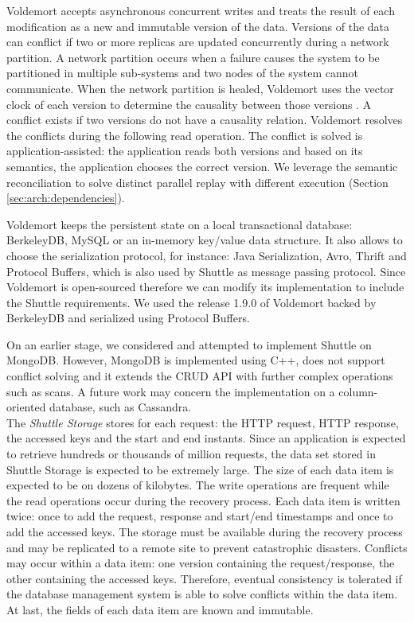 Voldemort accepts asynchronous concurrent writes and treats the result of each modification as a new and immutable version of the data. Versions of the data can conflict if two or more replicas are updated concurrently during a network partition. A network partition occurs when a failure causes the system to be partitioned in multiple sub-systems and two nodes of the system cannot communicate. When the network partition is healed, Voldemort uses the vector clock of each version to determine the causality between those versions \cite{Decandia2007}. A conflict exists if two versions do not have a causality relation. Voldemort resolves the conflicts during the following read operation. The conflict is solved is application-assisted: the application reads both versions and based on its semantics, the application chooses the correct version. We leverage the semantic reconciliation to solve distinct parallel replay with different execution (Section \ref{sec:arch:dependencies}).

Voldemort keeps the persistent state on a local transactional database: BerkeleyDB, MySQL or an in-memory key/value data structure. It also allows to choose the serialization protocol, for instance: Java Serialization, Avro, Thrift and Protocol Buffers, which is also used by Shuttle as message passing protocol. Since Voldemort is open-sourced therefore we can modify its implementation to include the Shuttle requirements. We used the release 1.9.0 of Voldemort backed by BerkeleyDB and serialized using Protocol Buffers.

On an earlier stage, we considered and attempted to implement Shuttle on MongoDB. However, MongoDB is implemented using C++, does not support conflict solving and it extends the \ac{CRUD} \ac{API} with further complex operations such as scans. A future work may concern the implementation on a column-oriented database, such as Cassandra.\\

The \emph{Shuttle Storage} stores for each request: the \ac{HTTP} request, \ac{HTTP} response, the accessed keys and the start and end instants. Since an application is expected to retrieve hundreds or thousands of million requests, the data set stored in Shuttle Storage is expected to be extremely large. The size of each data item is expected to be on dozens of kilobytes. The write operations are frequent while the read operations occur during the recovery process. Each data item is written twice: once to add the request, response and start/end timestamps and once to add the accessed keys. The storage must be available during the recovery process and may be replicated to a remote site to prevent catastrophic disasters. Conflicts may occur within a data item: one version containing the request/response, the other containing the accessed keys. Therefore, eventual consistency is tolerated if the database management system is able to solve conflicts within the data item. At last, the fields of each data item are known and immutable.

